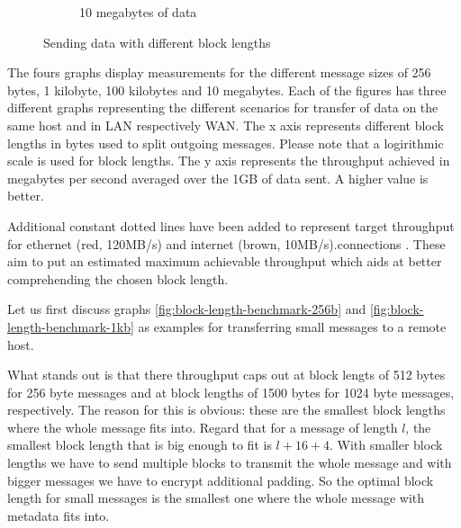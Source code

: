 \begin{figure}
\begin{subfigure}[t]{0.4\textwidth}
{
        }
        \caption{10 megabytes of data}
        \label{fig:block-length-benchmark-10mb}
    \end{subfigure}

    \caption{Sending data with different block lengths}
    \label{fig:block-length-benchmarks}
\end{figure}

The fours graphs display measurements for the different message sizes of 256 bytes, 1 kilobyte, 100 kilobytes and 10 megabytes.
Each of the figures has three different graphs representing the different scenarios for transfer of data on the same host and in LAN respectively WAN.
The x axis represents different block lengths in bytes used to split outgoing messages.
Please note that a logirithmic scale is used for block lengths.
The y axis represents the throughput achieved in megabytes per second averaged over the 1GB of data sent.
A higher value is better.

Additional constant dotted lines have been added to represent target throughput for ethernet (red, 120MB/s) and internet (brown, 10MB/s).connections .
These aim to put an estimated maximum achievable throughput which aids at better comprehending the chosen block length.

\medskip

Let us first discuss graphs \ref{fig:block-length-benchmark-256b} and \ref{fig:block-length-benchmark-1kb} as examples for transferring small messages to a remote host.

What stands out is that there throughput caps out at block lengts of 512 bytes for 256 byte messages and at block lengths of 1500 bytes for 1024 byte messages, respectively.
The reason for this is obvious: these are the smallest block lengths where the whole message fits into.
Regard that for a message of length $l$, the smallest block length that is big enough to fit is $l + 16 + 4$.
With smaller block lengths we have to send multiple blocks to transmit the whole message and with bigger messages we have to encrypt additional padding.
So the optimal block length for small messages is the smallest one where the whole message with metadata fits into.

